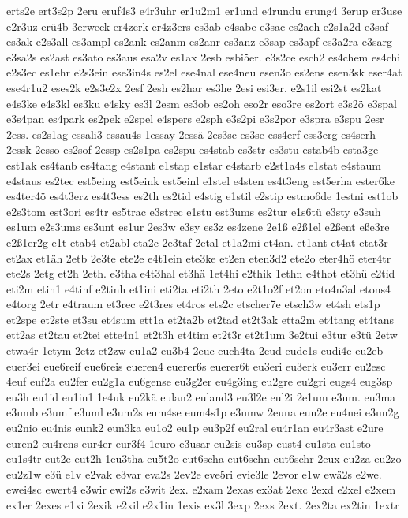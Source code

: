 {erts2e
ert3s2p
2eru
eruf4s3
e4r3uhr
er1u2m1
er1und
e4rundu
erung4
3erup
er3use
e2r3uz
erü4b
3erweck
er4zerk
er4z3ers
es3ab
e4sabe
e3sac
es2ach
e2s1a2d
e3saf
es3ak
e2s3all
es3ampl
es2ank
es2anm
es2anr
es3anz
e3sap
es3apf
es3a2ra
e3sarg
e3sa2s
es2ast
es3ato
es3aus
esa2v
es1ax
2esb
esbi5er.
e3s2ce
esch2
es4chem
es4chi
e2s3ec
es1ehr
e2s3ein
ese3in4s
es2el
ese4nal
ese4neu
esen3o
es2ens
esen3sk
eser4at
ese4r1u2
eses2k
e2s3e2x
2esf
2esh
es2har
es3he
2esi
esi3er.
e2s1il
esi2st
es2kat
e4s3ke
e4s3kl
es3ku
e4sky
es3l
2esm
es3ob
es2oh
eso2r
eso3re
es2ort
e3s2ö
e3spal
e3s4pan
es4park
es2pek
e2spel
e4spers
e2sph
e3s2pi
e3s2por
e3spra
e3spu
2esr
2ess.
es2s1ag
essali3
essau4s
1essay
2essä
2es3sc
es3se
ess4erf
ess3erg
es4serh
2essk
2esso
es2sof
2essp
es2s1pa
es2spu
es4stab
es3str
es3stu
estab4b
esta3ge
est1ak
es4tanb
es4tang
e4stant
e1stap
e1star
e4starb
e2st1a4s
e1stat
e4staum
e4staus
es2tec
est5eing
est5eink
est5einl
e1stel
e4sten
es4t3eng
est5erha
ester6ke
es4ter4ö
es4t3erz
es4t3ess
es2th
es2tid
e4stig
e1stil
e2stip
estmo6de
1estni
est1ob
e2s3tom
est3ori
es4tr
es5trac
e3strec
e1stu
est3ums
es2tur
e1s6tü
e3sty
e3suh
es1um
e2s3ums
es3unt
es1ur
2es3w
e3sy
es3z
es4zene
2e1ß
e2ß1el
e2ßent
eße3re
e2ß1er2g
e1t
etab4
et2abl
eta2c
2e3taf
2etal
et1a2mi
et4an.
et1ant
et4at
etat3r
et2ax
et1äh
2etb
2e3te
ete2e
e4t1ein
ete3ke
et2en
eten3d2
ete2o
eter4hö
eter4tr
ete2s
2etg
et2h
2eth.
e3tha
e4t3hal
et3hä
1et4hi
e2thik
1ethn
e4thot
et3hü
e2tid
eti2m
etin1
e4tinf
e2tinh
et1ini
eti2ta
eti2th
2eto
e2t1o2f
et2on
eto4n3al
etons4
e4torg
2etr
e4traum
et3rec
e2t3res
et4ros
ets2c
etscher7e
etsch3w
et4sh
ets1p
et2spe
et2ste
et3su
et4sum
ett1a
et2ta2b
et2tad
et2t3ak
etta2m
et4tang
et4tans
ett2as
et2tau
et2tei
ette4n1
et2t3h
et4tim
et2t3r
et2t1um
3e2tui
e3tur
e3tü
2etw
etwa4r
1etym
2etz
et2zw
eu1a2
eu3b4
2euc
euch4ta
2eud
eude1s
eudi4e
eu2eb
euer3ei
eue6reif
eue6reis
eueren4
euerer6s
euerer6t
eu3eri
eu3erk
eu3err
eu2esc
4euf
euf2a
eu2fer
eu2g1a
eu6gense
eu3g2er
eu4g3ing
eu2gre
eu2gri
eugs4
eug3sp
eu3h
eu1id
eu1in1
1e4uk
eu2kä
eulan2
euland3
eu3l2e
eul2i
2e1um
e3um.
eu3ma
e3umb
e3umf
e3uml
e3um2s
eum4se
eum4s1p
e3umw
2euna
eun2e
eu4nei
e3un2g
eu2nio
eu4nis
eunk2
eun3ka
eu1o2
eu1p
eu3p2f
eu2ral
eu4r1an
eu4r3ast
e2ure
euren2
eu4rens
eur4er
eur3f4
1euro
e3usar
eu2sis
eu3sp
eust4
eu1sta
eu1sto
eu1s4tr
eut2e
eut2h
1eu3tha
eu5t2o
eut6scha
eut6schn
eut6schr
2eux
eu2za
eu2zo
eu2z1w
e3ü
e1v
e2vak
e3var
eva2s
2ev2e
eve5ri
evie3le
2evor
e1w
ewä2s
e2we.
ewei4sc
ewert4
e3wir
ewi2s
e3wit
2ex.
e2xam
2exas
ex3at
2exc
2exd
e2xel
e2xem
ex1er
2exes
e1xi
2exik
e2xil
e2x1in
1exis
ex3l
3exp
2exs
2ext.
2ex2ta
ex2tin
1extr
}
